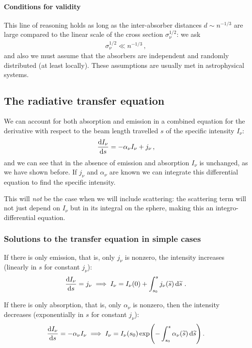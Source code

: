 \documentclass[main.tex]{subfiles}
\begin{document}
\paragraph{Conditions for validity}

This line of reasoning holds as long as the inter-absorber distances \(d \sim n^{-1/3}\) are large compared to the linear scale of the cross section \(\sigma_{\nu }^{1/2}\): we ask 
%
\begin{align}
\sigma_{\nu }^{1/2} \ll n^{-1/3}
\,,
\end{align}
%
and also we must assume that the absorbers are independent and randomly distributed (at least locally).
These assumptions are usually met in astrophysical systems. 

\subsection{The radiative transfer equation}

We can account for both absorption and emission in a combined equation for the derivative with respect to the beam length travelled \(s\) of the specific intensity \(I_{\nu }\): 
%
\begin{align}
\dv{I_{\nu }}{s} = - \alpha_{\nu } I_{\nu } + j_{\nu }
\,,
\end{align}
%
and we can see that in the absence of emission and absorption \(I_{\nu }\) is unchanged, as we have shown before.
If \(j_{\nu }\) and \(\alpha_{\nu }\) are known we can integrate this differential equation to find the specific intensity. 

This will \emph{not} be the case when we will include scattering: the scattering term will not just depend on \(I_{\nu }\) but in its integral on the sphere, making this an integro-differential equation. 

\subsubsection{Solutions to the transfer equation in simple cases}

If there is only emission, that is, only \(j_{\nu }\) is nonzero, the intensity increases (linearly in \(s\) for constant \(j_{\nu }\)): 
%
\begin{align}
\dv{I_{\nu }}{s} = j_{\nu } \implies 
I_{\nu } = I_{\nu }(0) + \int_{s_0 }^{s} j_{\nu } (\widetilde{s}) \dd{\widetilde{s}} 
\,.
\end{align}

If there is only absorption, that is, only \(\alpha_{\nu }\) is nonzero, then the intensity decreases (exponentially in \(s\) for constant \(j_{\nu }\)):
%
\begin{align}
\dv{I_{\nu }}{s} = - \alpha_{\nu } I_{\nu } \implies 
I_{\nu } = I_{\nu }(s_0 ) \exp(- \int_{s_0 }^{s} \alpha_{\nu }(\widetilde{s}) \dd{\widetilde{s}})
\,.
\end{align}
\end{document}
